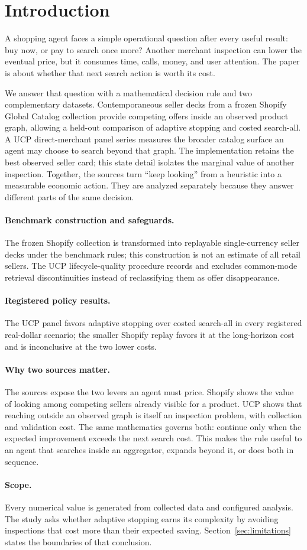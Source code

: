 \section{Introduction}
\label{sec:introduction}

A shopping agent faces a simple operational question after every useful result: buy
now, or pay to search once more? Another merchant inspection can lower the eventual
price, but it consumes time, calls, money, and user attention. The paper is about
whether that next search action is worth its cost.

We answer that question with a mathematical decision rule and two complementary
datasets. Contemporaneous seller decks from a frozen Shopify Global Catalog collection
provide competing offers inside an observed product graph, allowing a held-out
comparison of adaptive stopping and costed search-all. A UCP direct-merchant panel series
measures the broader catalog surface an agent may choose to search beyond that graph.
The implementation retains the best observed seller card; this state detail isolates
the marginal value of another inspection. Together, the sources turn ``keep looking''
from a heuristic into a measurable economic action. They are analyzed separately
because they answer different parts of the same decision.

\paragraph{Benchmark construction and safeguards.}
The frozen Shopify collection is transformed into replayable single-currency seller
decks under the benchmark rules; this construction is not an estimate of all retail
sellers. The UCP lifecycle-quality procedure records and excludes common-mode
retrieval discontinuities instead of reclassifying them as offer disappearance.

\paragraph{Registered policy results.}
The UCP panel favors adaptive stopping over costed search-all in every registered
real-dollar scenario; the smaller Shopify replay favors it at the long-horizon cost
and is inconclusive at the two lower costs.

\paragraph{Why two sources matter.}
The sources expose the two levers an agent must price. Shopify shows the value of
looking among competing sellers already visible for a product. UCP shows that reaching
outside an observed graph is itself an inspection problem, with collection and
validation cost. The same mathematics governs both: continue only when the expected
improvement exceeds the next search cost. This makes the rule useful to an agent that
searches inside an aggregator, expands beyond it, or does both in sequence.

\paragraph{Scope.}
Every numerical value is generated from collected data and configured analysis.
The study asks whether adaptive stopping earns its complexity by avoiding inspections
that cost more than their expected saving. Section~\ref{sec:limitations} states the
boundaries of that conclusion.